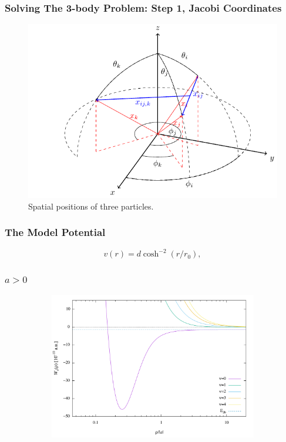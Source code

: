 \documentclass{beamer}
\begin{document}
\begin{frame}
\frametitle{Solving The 3-body Problem: Step 1, Jacobi Coordinates}
\begin{figure}
\centering
\includegraphics[width=0.7\linewidth]{img01.pdf}
\caption{Spatial positions of three particles.}
\end{figure}
\end{frame}

\begin{frame}
\frametitle{The Model Potential}
\begin{equation}
v(r) = d\cosh^{-2}{(r/r_0)},
\end{equation}
\end{frame}

\begin{frame}
\frametitle{$a>0$}
\begin{figure}
	\begin{figure}
		\includegraphics[width=0.8\linewidth]{Wpos.pdf}
	\end{figure}
\end{figure}
\end{frame}
\end{document}
